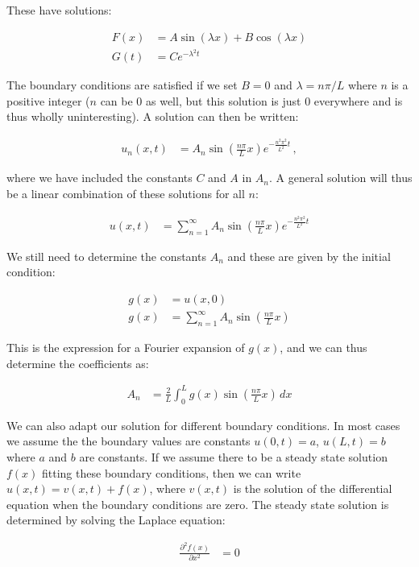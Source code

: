 \documentclass[reprint,english,notitlepage]{revtex4-1}  %
\begin{document}
These have solutions:

\begin{align*}
F(x) &= A \sin (\lambda x) + B \cos ( \lambda x) \\
G(t) &= Ce^{-\lambda^2 t}
\end{align*}

The boundary conditions are satisfied if we set $B = 0$ and $\lambda = n\pi /L$ where $n$ is a positive integer ($n$ can be 0 as well, but this solution is just 0 everywhere and is thus wholly uninteresting). A solution can then be written:

\begin{align*}
u_n(x,t) &= A_n \sin (\frac{n\pi}{L} x ) e^{-\frac{n^2 \pi^2}{L^2} t} \, ,
\end{align*}

where we have included the constants $C$ and $A$ in $A_n$. A general solution will thus be a linear combination of these solutions for all $n$:

\begin{align*}
u(x,t) &= \sum\limits_{n=1}^\infty A_n \sin (\frac{n\pi}{L} x) e^{-\frac{n^2 \pi^2}{L^2} t} 
\end{align*}

We still need to determine the constants $A_n$ and these are given by the initial condition:

\begin{align*}
g(x) &= u(x,0) \\
g(x) &= \sum\limits_{n=1}^\infty A_n \sin ( \frac{n\pi}{L} x) 
\end{align*}

This is the expression for a Fourier expansion of $g(x)$, and we can thus determine the coefficients as:

\begin{align*}
A_n &= \frac{2}{L} \int_0^L g(x) \sin (\frac{n\pi}{L} x) \, dx
\end{align*}

We can also adapt our solution for different boundary conditions. In most cases we assume the the boundary values are constants $u(0,t) = a$, $u(L,t) = b$ where $a$ and $b$ are constants. If we assume there to be a steady state solution $f(x)$ fitting these boundary conditions, then we can write $u(x,t) = v(x,t) + f(x)$, where $v(x,t)$ is the solution of the differential equation when the boundary conditions are zero. The steady state solution is determined by solving the Laplace equation:

\begin{align*}
\frac{\partial^2 f(x)}{\partial x^2} &= 0 
\end{align*}
\end{document}
